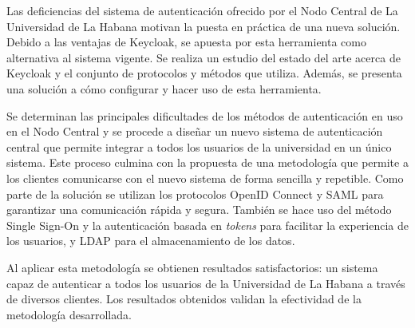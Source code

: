 \begin{resumen}
	Las deficiencias del sistema de autenticación ofrecido por el Nodo Central de La Universidad de La Habana motivan la puesta en práctica de una nueva solución. Debido a las ventajas de Keycloak, se apuesta por esta herramienta como alternativa al sistema vigente. Se realiza un estudio del estado del arte acerca de Keycloak y el conjunto de protocolos y métodos que utiliza. Además, se presenta una solución a cómo configurar y hacer uso de esta herramienta.
	
	Se determinan las principales dificultades de los métodos de autenticación en uso en el Nodo Central y se procede a diseñar un nuevo sistema de autenticación central que permite integrar a todos los usuarios de la universidad en un único sistema. Este proceso culmina con la propuesta de una metodología que permite a los clientes comunicarse con el nuevo sistema de forma sencilla y repetible. Como parte de la solución se utilizan los protocolos OpenID Connect y SAML para garantizar una comunicación rápida y segura. También se hace uso del método Single Sign-On y la autenticación basada en \textit{tokens} para facilitar la experiencia de los usuarios, y LDAP para el almacenamiento de los datos.
	
	Al aplicar esta metodología se obtienen resultados satisfactorios: un sistema capaz de autenticar a todos los usuarios de la Universidad de La Habana a través de diversos clientes. Los resultados obtenidos validan la efectividad de la metodología desarrollada.


\end{resumen}

